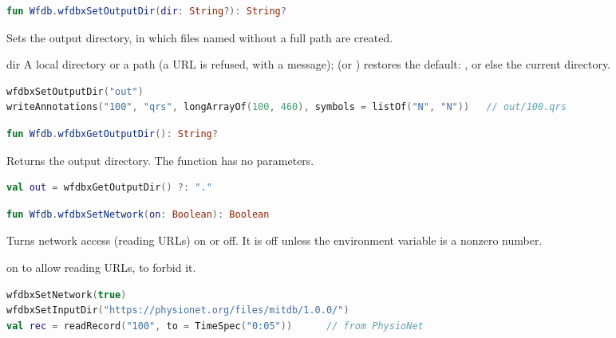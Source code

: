 \begin{lstlisting}[language=Kotlin,style=signature]
fun Wfdb.wfdbxSetOutputDir(dir: String?): String?
\end{lstlisting}
Sets the output directory, in which files named without a full path are created.
\begin{params}
\item[dir] A local directory or a \code{\textasciitilde} path (a URL is refused, with a
  message);  (or ) restores the default: , or
  else the current directory.
\end{params}
\begin{lstlisting}[language=Kotlin]
wfdbxSetOutputDir("out")
writeAnnotations("100", "qrs", longArrayOf(100, 460), symbols = listOf("N", "N"))   // out/100.qrs
\end{lstlisting}

\begin{lstlisting}[language=Kotlin,style=signature]
fun Wfdb.wfdbxGetOutputDir(): String?
\end{lstlisting}
Returns the output directory. The function has no parameters.
\begin{lstlisting}[language=Kotlin]
val out = wfdbxGetOutputDir() ?: "."
\end{lstlisting}

\begin{lstlisting}[language=Kotlin,style=signature]
fun Wfdb.wfdbxSetNetwork(on: Boolean): Boolean
\end{lstlisting}
Turns network access (reading URLs) on or off. It is off unless the environment variable
 is a nonzero number.
\begin{params}
\item[on]  to allow reading URLs,  to forbid it.
\end{params}
\begin{lstlisting}[language=Kotlin]
wfdbxSetNetwork(true)
wfdbxSetInputDir("https://physionet.org/files/mitdb/1.0.0/")
val rec = readRecord("100", to = TimeSpec("0:05"))      // from PhysioNet
\end{lstlisting}

